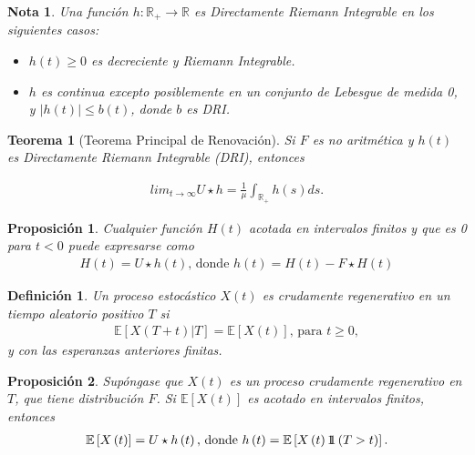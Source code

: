 \documentclass{article}
\newtheorem{Def}{Definición}
\newtheorem{Teo}{Teorema}
\newtheorem{Note}{Nota}
\newtheorem{Prop}{Proposición}
\newcommand{\rea}{\mathbb{R}}
\newcommand{\esp}{\mathbb{E}}
\newcommand{\indora}{\mbox{$1$\hspace{-0.8ex}$1$}}
\begin{document}
\begin{Note} Una funci\'on $h:\rea_{+}\rightarrow\rea$ es Directamente Riemann Integrable en los siguientes casos:
\begin{itemize}
\item[a)] $h\left(t\right)\geq0$ es decreciente y Riemann Integrable.
\item[b)] $h$ es continua excepto posiblemente en un conjunto de Lebesgue de medida 0, y $|h\left(t\right)|\leq b\left(t\right)$, donde $b$ es DRI.
\end{itemize}
\end{Note}

\begin{Teo}[Teorema Principal de Renovaci\'on]
Si $F$ es no aritm\'etica y $h\left(t\right)$ es Directamente Riemann Integrable (DRI), entonces

\begin{eqnarray*}
lim_{t\rightarrow\infty}U\star h=\frac{1}{\mu}\int_{\rea_{+}}h\left(s\right)ds.
\end{eqnarray*}
\end{Teo}

\begin{Prop}
Cualquier funci\'on $H\left(t\right)$ acotada en intervalos finitos y que es 0 para $t<0$ puede expresarse como
\begin{eqnarray*}
H\left(t\right)=U\star h\left(t\right)\textrm{,  donde }h\left(t\right)=H\left(t\right)-F\star H\left(t\right)
\end{eqnarray*}
\end{Prop}

\begin{Def}
Un proceso estoc\'astico $X\left(t\right)$ es crudamente regenerativo en un tiempo aleatorio positivo $T$ si
\begin{eqnarray*}
\esp\left[X\left(T+t\right)|T\right]=\esp\left[X\left(t\right)\right]\textrm{, para }t\geq0,\end{eqnarray*}
y con las esperanzas anteriores finitas.
\end{Def}

\begin{Prop}
Sup\'ongase que $X\left(t\right)$ es un proceso crudamente regenerativo en $T$, que tiene distribuci\'on $F$. Si $\esp\left[X\left(t\right)\right]$ es acotado en intervalos finitos, entonces
\begin{eqnarray*}
\esp\left[X\left(t\right)\right]=U\star h\left(t\right)\textrm{,  donde }h\left(t\right)=\esp\left[X\left(t\right)\indora\left(T>t\right)\right].
\end{eqnarray*}
\end{Prop}
\end{document}
